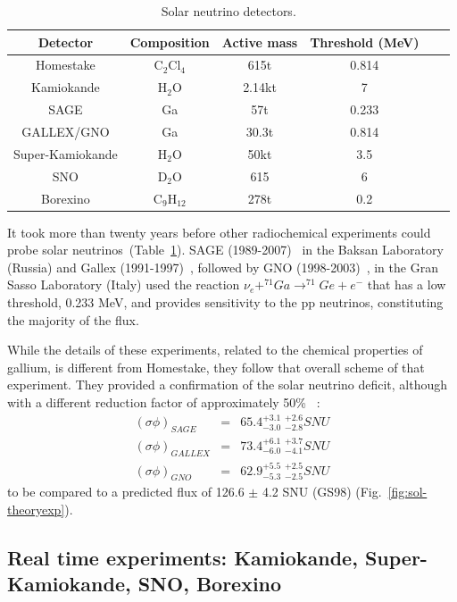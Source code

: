 \begin{table}
\caption{Solar neutrino detectors.}
\centering
\begin{tabular}{|c|c|c|c|c|c|}
  \hline
  Detector & Composition & Active mass & Threshold (MeV)  \\ 
  \hline
Homestake & C$_2$Cl$_4$ & 615t &  0.814 \\
Kamiokande & H$_2$O & 2.14kt &  7  \\
SAGE & Ga & 57t &  0.233 \\
GALLEX/GNO & Ga & 30.3t &  0.814  \\
Super-Kamiokande &  H$_2$O & 50kt &  3.5 \\
SNO & D$_2$O & 615 &  6\\
Borexino & C$_9$H$_{12}$ & 278t &  0.2  \\
  \hline
\end{tabular}

\label{tab:snudet}
\end{table}

It took more than twenty years before other radiochemical experiments could probe solar neutrinos~(Table~\ref{tab:snudet}). SAGE (1989-2007)~\cite{abdurashitov} in the Baksan Laboratory (Russia) and Gallex (1991-1997)~\cite{hampel}, followed by GNO (1998-2003)~\cite{altmann}, in the Gran Sasso Laboratory (Italy) used the reaction  $\nu_e  + ^{71}Ga \rightarrow ^{71}Ge + e^-$
that has a low threshold, 0.233 MeV, and provides sensitivity to the pp neutrinos, constituting the majority of the flux. 

While the details of these experiments, related to the chemical properties of gallium, is different from Homestake, they follow that overall scheme of that experiment. They provided a confirmation of the solar neutrino deficit, although with a different reduction factor of approximately 50\% ~\cite{abdurashitov,hampel,altmann,kaether}:
\begin{eqnarray}
(\sigma \phi)_{SAGE} & = & 65.4^{+3.1} _{-3.0} \; ^{+2.6} _{-2.8}  SNU \\
(\sigma \phi)_{GALLEX} & = & 73.4  ^{+6.1}_{-6.0} \; ^{+3.7} _{-4.1} SNU \\
(\sigma \phi)_{GNO} & = & 62.9  ^{+5.5} _{-5.3} \; ^{+2.5} _{-2.5} SNU 
\end{eqnarray}
to be compared to a predicted flux of 126.6 $\pm$ 4.2 SNU (GS98) (Fig.~\ref{fig:sol-theoryexp}).


\subsection{Real time experiments: Kamiokande, Super-Kamiokande, SNO, Borexino}

